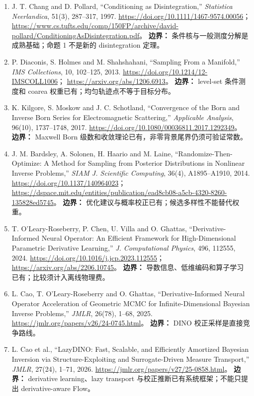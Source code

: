 \begin{enumerate}[label=\textbf{L\arabic*.},leftmargin=3em,itemsep=.7em]
\item J. T. Chang and D. Pollard, “Conditioning as Disintegration,” \emph{Statistica Neerlandica}, 51(3), 287--317, 1997.
\url{https://doi.org/10.1111/1467-9574.00056}；
\url{https://www.cs.tufts.edu/comp/150FP/archive/david-pollard/ConditioningAsDisintegration.pdf}。
\textbf{边界：} 条件核与一般测度分解是成熟基础；命题 1 不是新的 disintegration 定理。

\item P. Diaconis, S. Holmes and M. Shahshahani, “Sampling From a Manifold,” \emph{IMS Collections}, 10, 102--125, 2013.
\url{https://doi.org/10.1214/12-IMSCOLL1006}；
\url{https://arxiv.org/abs/1206.6913}。
\textbf{边界：} level-set 条件测度和 coarea 权重已有；均匀轨迹点不等于目标分布。

\item K. Kilgore, S. Moskow and J. C. Schotland, “Convergence of the Born and Inverse Born Series for Electromagnetic Scattering,” \emph{Applicable Analysis}, 96(10), 1737--1748, 2017.
\url{https://doi.org/10.1080/00036811.2017.1292349}。
\textbf{边界：} Maxwell Born 级数和收敛理论已有，非零背景尾界仍须可验证常数。

\item J. M. Bardsley, A. Solonen, H. Haario and M. Laine, “Randomize-Then-Optimize: A Method for Sampling from Posterior Distributions in Nonlinear Inverse Problems,” \emph{SIAM J. Scientific Computing}, 36(4), A1895--A1910, 2014.
\url{https://doi.org/10.1137/140964023}；
\url{https://dspace.mit.edu/entities/publication/ead8cb08-a5cb-4320-8260-135828ed5745}。
\textbf{边界：} 优化建议与概率校正已有；候选多样性不能替代权重。

\item T. O'Leary-Roseberry, P. Chen, U. Villa and O. Ghattas, “Derivative-Informed Neural Operator: An Efficient Framework for High-Dimensional Parametric Derivative Learning,” \emph{J. Computational Physics}, 496, 112555, 2024.
\url{https://doi.org/10.1016/j.jcp.2023.112555}；
\url{https://arxiv.org/abs/2206.10745}。
\textbf{边界：} 导数信息、低维编码和算子学习已有；比较须计入离线物理费。

\item L. Cao, T. O'Leary-Roseberry and O. Ghattas, “Derivative-Informed Neural Operator Acceleration of Geometric MCMC for Infinite-Dimensional Bayesian Inverse Problems,” \emph{JMLR}, 26(78), 1--68, 2025.
\url{https://jmlr.org/papers/v26/24-0745.html}。
\textbf{边界：} DINO 校正采样是直接竞争路线。

\item L. Cao et al., “LazyDINO: Fast, Scalable, and Efficiently Amortized Bayesian Inversion via Structure-Exploiting and Surrogate-Driven Measure Transport,” \emph{JMLR}, 27(24), 1--71, 2026.
\url{https://jmlr.org/papers/v27/25-0858.html}。
\textbf{边界：} derivative learning、lazy transport 与校正推断已有系统框架；不能只提出 derivative-aware Flow。


\end{enumerate}
